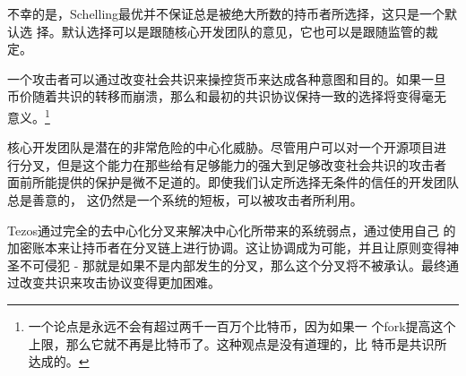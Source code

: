 \documentclass[letterpaper]{article}
\begin{document}
不幸的是，Schelling最优并不保证总是被绝大所数的持币者所选择，这只是一个默认选
择。默认选择可以是跟随核心开发团队的意见，它也可以是跟随监管的裁定。


一个攻击者可以通过改变社会共识来操控货币来达成各种意图和目的。如果一旦
币价随着共识的转移而崩溃，那么和最初的共识协议保持一致的选择将变得毫无
意义。\footnote{一个论点是永远不会有超过两千一百万个比特币，因为如果一
  个fork提高这个上限，那么它就不再是比特币了。这种观点是没有道理的，比
  特币是共识所达成的。}

核心开发团队是潜在的非常危险的中心化威胁。尽管用户可以对一个开源项目进
行分叉，但是这个能力在那些给有足够能力的强大到足够改变社会共识的攻击者
面前所能提供的保护是微不足道的。即使我们认定所选择无条件的信任的开发团队总是善意的，
这仍然是一个系统的短板，可以被攻击者所利用。


Tezos通过完全的去中心化分叉来解决中心化所带来的系统弱点，通过使用自己
的加密账本来让持币者在分叉链上进行协调。这让协调成为可能，并且让原则变得神圣不可侵犯
- 那就是如果不是内部发生的分叉，那么这个分叉将不被承认。最终通过改变共识来攻击协议变得更加困难。
\end{document}
